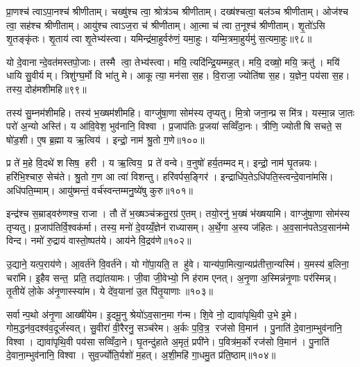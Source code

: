 प्रा॒णश्च॑ त्वाऽपा॒नश्च॑ श्रीणीताम्। चख्षु॑श्च त्वा॒ श्रोत्र॑ञ्च श्रीणीताम्। दख्ष॑श्चत्वा॒ बल॑ञ्च श्रीणीताम्। ओज॑श्च त्वा॒ सह॑श्च श्रीणीताम्। आयु॑श्च त्वाऽज॒रा च॑ श्रीणीताम्। आ॒त्मा च॑ त्वा त॒नूश्च॑ श्रीणीताम्। शृ॒तो॑ऽसि शृ॒तङ्कृ॑तः। शृ॒ताय॑ त्वा शृ॒तेभ्य॑स्त्वा। यमिन्द्र॑मा॒हुर्वरु॑णं॒ यमा॒हुः। यम्मि॒त्रमा॒हुर्यमु॑ स॒त्यमा॒हुः॥९८॥

यो दे॒वानान्दे॒वत॑मस्तपो॒जाः। तस्मै त्वा॒ तेभ्य॑स्त्वा। मयि॒ त्यदि॑न्द्रि॒यम्मह॒त्। मयि॒ दख्षो॒ मयि॒ क्रतु॑। मयि॑ धायि सु॒वीर्यम्। त्रिशु॑ग्घ॒र्मो वि भा॑तु मे। आकूत्या॒ मन॑सा स॒ह। वि॒राजा॒ ज्योति॑षा स॒ह। य॒ज्ञेन॒ पय॑सा स॒ह। तस्य॒ दोह॑मशीमहि॥९९॥

तस्य॑ सु॒म्नम॑शीमहि। तस्य॑ भ॒ख्षम॑शीमहि। वाग्जु॑षा॒णा सोम॑स्य तृप्यतु। मि॒त्रो जना॒न्प्र स मि॑त्र। यस्मा॒न्न जा॒तः परो॑ अ॒न्यो अस्ति॑। य आ॑वि॒वेश॒ भुव॑नानि॒ विश्वा। प्र॒जाप॑तिः प्र॒जया॑ सव्विँदा॒नः। त्रीणि॒ ज्योतीषि सचते॒ स षो॑ड॒शी। ए॒ष ब्र॒ह्मा य ऋ॒त्विय॑। इन्द्रो॒ नाम॑ श्रु॒तो ग॒णे॥१००॥

प्र ते॑ म॒हे वि॒दथे॑ शसिष॒ हरी। य ऋ॒त्विय॒ प्र ते॑ वन्वे। व॒नुषो॑ हर्य॒तम्मदम्। इन्द्रो॒ नाम॑ घृ॒तन्नयः। हरि॑भि॒श्चारु॒ सेच॑ते। श्रु॒तो ग॒ण आ त्वा॑ विशन्तु। हरि॑वर्पस॒ङ्गिर॑। इन्द्राधि॑प॒तेऽधि॑पति॒स्त्वन्दे॒वाना॑मसि। अधि॑पति॒म्माम्। आयु॑ष्मन्तं॒ वर्च॑स्वन्तम्मनु॒ष्ये॑षु कुरु॥१०१॥

इन्द्र॑श्च स॒म्राड्वरु॑णश्च॒ राजा। तौ ते॑ भ॒ख्षञ्च॑क्रतु॒रग्र॑ ए॒तम्। तयो॒रनु॑ भ॒ख्षं भ॑ख्षयामि। वाग्जु॑षा॒णा सोम॑स्य तृप्यतु। प्र॒जाप॑तिर्वि॒श्वक॑र्मा। तस्य॒ मनो॑ दे॒वय्यँ॒ज्ञेन॑ राध्यासम्। अ॒र्थे॒गा अ॒स्य ज॑हितः। अ॒व॒सान॑पतेऽव॒सान॑म्मे विन्द। नमो॑ रु॒द्राय॑ वास्तो॒ष्पत॑ये। आय॑ने वि॒द्रव॑णे॥१०२॥

उ॒द्याने॒ यत्प॒राय॑णे। आ॒वर्त॑ने वि॒वर्त॑ने। यो गो॑पा॒यति॒ त हु॑वे। यान्य॑पा॒मित्या॒न्यप्र॑तीत्ता॒न्यस्मि॑। य॒मस्य॑ ब॒लिना॒ चरा॑मि। इ॒हैव सन्त॒ प्रति॒ तद्या॑तयामः। जी॒वा जी॒वेभ्यो॒ नि ह॑राम एनत्। अ॒नृ॒णा अ॒स्मिन्न॑नृ॒णाः पर॑स्मिन्न्। तृ॒तीये॑ लो॒के अ॑नृ॒णास्स्या॑म। ये दे॑व॒याना॑ उ॒त पि॑तृ॒याणाः॥१०३॥

सर्वान्प॒थो अ॑नृ॒णा आख्षी॑येम। इ॒दमू॒नु श्रेयो॑ऽव॒सान॒मा ग॑न्म। शि॒वे नो॒ द्यावा॑पृथि॒वी उ॒भे इ॒मे। गोम॒द्धन॑व॒दश्व॑व॒दूर्ज॑स्वत्। सु॒वीरा॑ वी॒रैरनु॒ सञ्च॑रेम। अ॒र्कः प॒वि॒त्र॒ रज॑सो वि॒मान॑। पु॒नाति॑ दे॒वाना॒म्भुव॑नानि॒ विश्वा। द्यावा॑पृथि॒वी पय॑सा सव्विँदा॒ने। घृ॒तन्दु॑हाते अ॒मृतं॒ प्रपी॑ने। प॒वित्र॑म॒र्को रज॑सो वि॒मान॑। पु॒नाति॑ दे॒वाना॒म्भुव॑नानि॒ विश्वा। सुव॒र्ज्योति॒र्यशो॑ म॒हत्। अ॒शी॒महि॑ गा॒धमु॒त प्र॑ति॒ष्ठाम्॥१०४॥\anuvakamend[चा॒त॒य॒त॒ श्री॒णी॒ता॒ स॒त्यमा॒हुर॑शीमहि ग॒णे कु॑रु वि॒द्रव॑णे पितृ॒याणा॑ अ॒र्को रज॑सो वि॒मान॒स्त्रीणि॑ च]


